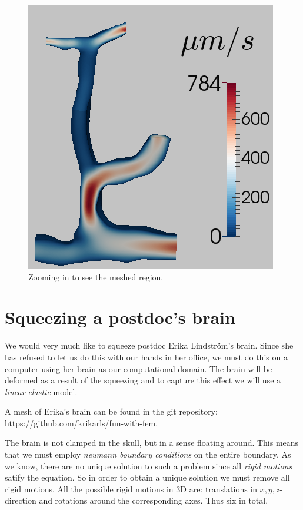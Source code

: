 \documentclass[epsfig,11pt]{article}
\begin{document}
\begin{figure}[h!] 
\begin{center}
  \includegraphics[scale=0.4]{result.png}
  \end{center}
  \caption{Zooming in to see the meshed region.}
\end{figure}


\section{Squeezing a postdoc's brain}

We would very much like to squeeze postdoc Erika Lindström's brain. Since she has refused to let us do this with our hands in her office, we must do this on a computer using her brain as our computational domain. The brain will be deformed as a result of the squeezing and to capture this effect we will use a \emph{linear elastic} model. 

A mesh of Erika's brain can be found in the git repository:
 https://github.com/krikarls/fun-with-fem. 
 

The brain is not clamped in the skull, but in a sense floating around. This means that we must employ \emph{neumann boundary conditions} on the entire boundary. As we know, there are no unique solution to such a problem since all \emph{rigid motions} satify the equation. So in order to obtain a unique solution we must remove all rigid motions. All the possible rigid motions in 3D are: translations in $x,y,z$-direction and rotations around the corresponding axes. Thus six in total.
\end{document}

